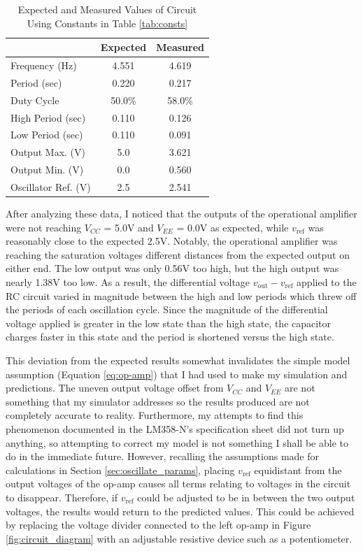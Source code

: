 \documentclass[12pt]{article}
\begin{document}
\begin{spreadlines}{1ex}
\begin{table}[h]
    \centering
    \caption{Expected and Measured Values of Circuit Using Constants in Table \ref{tab:consts}}\vspace{2mm}
    \begin{tabular}{l|c|c}
    & Expected & Measured\\
    \hline
    Frequency (Hz) & 4.551 & 4.619 \\
    Period (sec) & 0.220 & 0.217 \\
    Duty Cycle & 50.0\% & 58.0\%\\
    High Period (sec) & 0.110 & 0.126 \\
    Low Period (sec) & 0.110 & 0.091 \\
    Output Max. (V) & 5.0 & 3.621\\
    Output Min. (V) & 0.0 & 0.560 \\
    Oscillator Ref. (V) & 2.5 & 2.541 \\
    \end{tabular}
    \label{tab:expected_vs_real}
\end{table}
\end{spreadlines}

After analyzing these data, I noticed that the outputs of the operational amplifier were not reaching $V_{CC}$ = 5.0V and $V_{EE}$ = 0.0V as expected, while $v_\text{ref}$ was reasonably close to the expected 2.5V. Notably, the operational amplifier was reaching the saturation voltages different distances from the expected output on either end. The low output was only 0.56V too high, but the high output was nearly 1.38V too low. As a result, the differential voltage $v_\text{out} - v_\text{ref}$ applied to the RC circuit varied in magnitude between the high and low periods which threw off the periods of each oscillation cycle. Since the magnitude of the differential voltage applied is greater in the low state than the high state, the capacitor charges faster in this state and the period is shortened versus the high state.
\par
This deviation from the expected results somewhat invalidates the simple model assumption (Equation \ref{eq:op-amp}) that I had used to make my simulation and predictions. The uneven output voltage offset from $V_{CC}$ and $V_{EE}$ are not something that my simulator addresses so the results produced are not completely accurate to reality. Furthermore, my attempts to find this phenomenon documented in the LM358-N's specification sheet did not turn up anything, so attempting to correct my model is not something I shall be able to do in the immediate future. However, recalling the assumptions made for calculations in Section \ref{sec:oscillate_params}, placing $v_\text{ref}$ equidistant from the output voltages of the op-amp causes all terms relating to voltages in the circuit to disappear. Therefore, if $v_\text{ref}$ could be adjusted to be in between the two output voltages, the results would return to the predicted values. This could be achieved by replacing the voltage divider connected to the left op-amp in Figure \ref{fig:circuit_diagram} with an adjustable resistive device such as a potentiometer.
\end{document}
